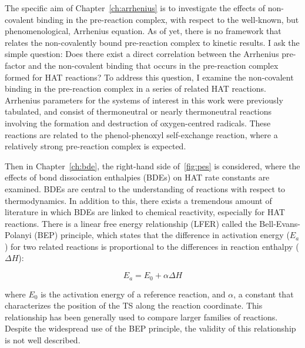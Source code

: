 \begin{doublespace}
The specific aim of Chapter~\ref{ch:arrhenius} is to investigate the effects of
non-covalent binding in the pre-reaction complex, with respect to the
well-known, but phenomenological, Arrhenius equation. As of yet, there is no
framework that relates the non-covalently bound pre-reaction complex to kinetic
results. I ask the simple question: Does there exist a direct correlation
between the Arrhenius pre-factor and the non-covalent binding that occurs in the
pre-reaction complex formed for HAT reactions? To address this question, I
examine the non-covalent binding in the pre-reaction complex in a series of
related HAT reactions. Arrhenius parameters for the systems of interest in this
work were previously tabulated,\cite{DiLabio2005} and consist of thermoneutral
or nearly thermoneutral reactions involving the formation and destruction of
oxygen-centred radicals. These reactions are related to the phenol-phenoxyl
self-exchange reaction, where a relatively strong pre-reaction complex is
expected.

Then in Chapter~\ref{ch:bde}, the right-hand side of~\ref{fig:pes} is
considered, where the effects of bond dissociation enthalpies (BDEs) on HAT rate
constants are examined. BDEs are central to the understanding of reactions with
respect to thermodynamics. In addition to this, there exists a tremendous amount
of literature in which BDEs are linked to chemical reactivity, especially for
HAT reactions.\cite{Kochi1973, Tedder1982, Wijtmans2003, Pratt2004, Mayer2004}
There is a linear free energy relationship (LFER) called the Bell-Evans-Polanyi
(BEP) principle,\cite{Bell1936,Evans1938} which states that the difference in
activation energy ($E_a$) for two related reactions is proportional to the
differences in reaction enthalpy ($\Delta H$):

\begin{equation}
  E_a = E_0 + \alpha \Delta H
  \label{eq:bep}
\end{equation}

\noindent where $E_0$ is the activation energy of a reference reaction, and
$\alpha$, a constant that characterizes the position of the TS along the
reaction coordinate. This relationship has been generally used to compare
larger families of reactions. Despite the widespread use of the BEP principle,
the validity of this relationship is not well described.


\end{doublespace}
